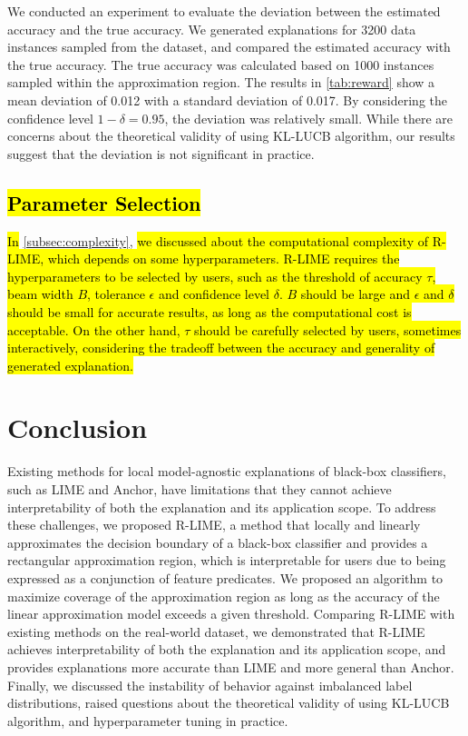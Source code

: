 \documentclass[runningheads]{llncs}
\begin{document}
{We conducted an experiment to evaluate the deviation
between the estimated accuracy and the true accuracy.
We generated explanations for 3200 data instances sampled from the dataset,
and compared the estimated accuracy with the true accuracy.
The true accuracy was calculated based on 1000 instances sampled
within the approximation region.
The results in \cref{tab:reward} show a mean deviation of 0.012
with a standard deviation of 0.017.
By considering the confidence level $1-\delta=0.95$,
the deviation was relatively small.
While there are concerns about the theoretical validity of using KL-LUCB algorithm,
our results suggest that the deviation is not significant in practice.

\subsection{\hl{Parameter Selection}}\label{sec:param}

\hl{In} \cref{subsec:complexity},
\hl{%
  we discussed about the computational complexity of R-LIME,
  which depends on some hyperparameters.
  R-LIME requires the hyperparameters to be selected by users,
  such as the threshold of accuracy $\tau$, beam width $B$, tolerance $\epsilon$
  and confidence level $\delta$.
  $B$ should be large and $\epsilon$ and $\delta$ should be small for
  accurate results, as long as the computational cost is acceptable.
  On the other hand, $\tau$ should be carefully selected by users,
  sometimes interactively, considering the tradeoff between
  the accuracy and generality of generated explanation.
}

\section{Conclusion}
Existing methods for
local model-agnostic explanations of black-box classifiers,
such as LIME and Anchor,
have limitations that they cannot achieve interpretability of
both the explanation and its application scope.
To address these challenges,
we proposed R-LIME,
a method that locally and linearly approximates the decision boundary
of a black-box classifier and provides a rectangular approximation region,
which is interpretable for users due to being expressed as a conjunction of feature predicates.
We proposed an algorithm to
maximize coverage of the approximation region
as long as the accuracy of the linear approximation model exceeds a given threshold.
Comparing R-LIME with existing methods on the real-world dataset,
we demonstrated that R-LIME achieves interpretability of both the explanation
and its application scope,
and provides explanations more accurate than LIME and more general than Anchor.
Finally,
we discussed the instability of behavior against imbalanced label distributions,
raised questions about the theoretical validity of using KL-LUCB algorithm,
and hyperparameter tuning in practice.

\newpage


}

\newpage
\setcounter{page}{1}
\paper{}
\renewcommand{\hl}[1]{#1}
\newpage
\setcounter{page}{1}
\paper{}
\end{document}
